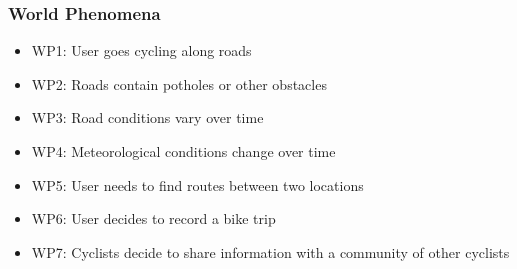 \subsubsection{World Phenomena}
\begin{itemize}
    \item WP1: User goes cycling along roads
    \item WP2: Roads contain potholes or other obstacles
    \item WP3: Road conditions vary over time
    \item WP4: Meteorological conditions change over time
    \item WP5: User needs to find routes between two locations
    \item WP6: User decides to record a bike trip
    \item WP7: Cyclists decide to share information with a community of other cyclists
\end{itemize}

